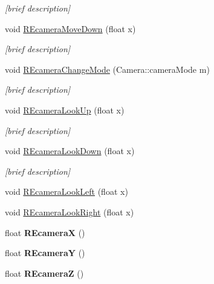 \begin{DoxyCompactItemize}
\begin{DoxyCompactList}\small\item\em \mbox{[}brief description\mbox{]} \end{DoxyCompactList}\item 
void \hyperlink{class_i_s_e_a2a7a08c1bfd2bec4f9c6f36c2e8525cf}{R\-Ecamera\-Move\-Down} (float x)
\begin{DoxyCompactList}\small\item\em \mbox{[}brief description\mbox{]} \end{DoxyCompactList}\item 
void \hyperlink{class_i_s_e_a6f575da4f156b4f781c074c914c0f916}{R\-Ecamera\-Change\-Mode} (Camera\-::camera\-Mode m)
\begin{DoxyCompactList}\small\item\em \mbox{[}brief description\mbox{]} \end{DoxyCompactList}\item 
void \hyperlink{class_i_s_e_a24b550f263464fb9ac75d68b75e123ab}{R\-Ecamera\-Look\-Up} (float x)
\begin{DoxyCompactList}\small\item\em \mbox{[}brief description\mbox{]} \end{DoxyCompactList}\item 
void \hyperlink{class_i_s_e_ab7a40ee7f17546a2d00234b420870202}{R\-Ecamera\-Look\-Down} (float x)
\begin{DoxyCompactList}\small\item\em \mbox{[}brief description\mbox{]} \end{DoxyCompactList}\item 
void \hyperlink{class_i_s_e_ae3eb6e3a02a12d3d1c7d3e786a3a5b69}{R\-Ecamera\-Look\-Left} (float x)
\item 
void \hyperlink{class_i_s_e_a47278cfe9c73168f56596994418c24d0}{R\-Ecamera\-Look\-Right} (float x)
\item 
\hypertarget{class_i_s_e_ad2c973c96d18a6abf1023dfa8ad81b3b}{float {\bfseries R\-Ecamera\-X} ()}\label{class_i_s_e_ad2c973c96d18a6abf1023dfa8ad81b3b}

\item 
\hypertarget{class_i_s_e_a1e0f7dca14c51f357e577e9353f30181}{float {\bfseries R\-Ecamera\-Y} ()}\label{class_i_s_e_a1e0f7dca14c51f357e577e9353f30181}

\item 
\hypertarget{class_i_s_e_a28f641d9358b36730b4c2f5d86c52463}{float {\bfseries R\-Ecamera\-Z} ()}\label{class_i_s_e_a28f641d9358b36730b4c2f5d86c52463}


\end{DoxyCompactItemize}

